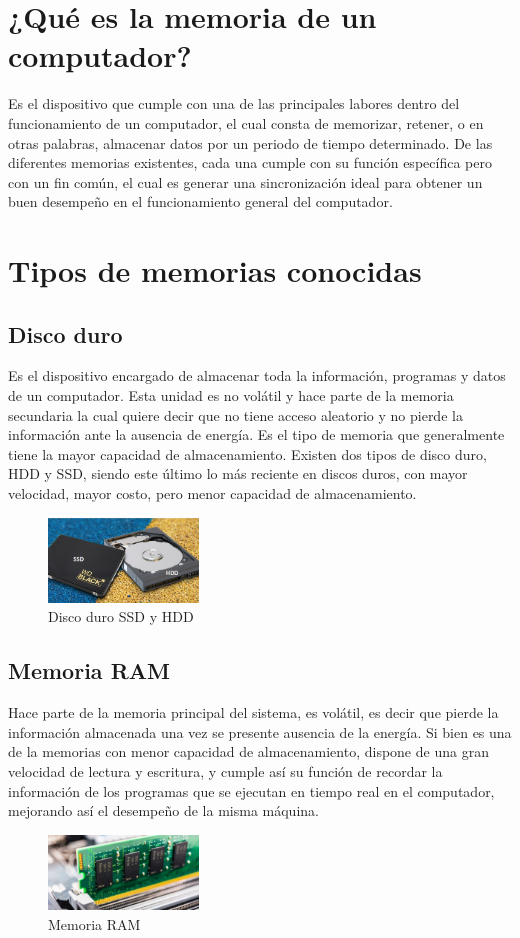 \documentclass{article}
\begin{document}
\section{¿Qué es la memoria de un computador?}
Es el dispositivo que cumple con una de las principales labores dentro del funcionamiento de un computador, el cual consta de memorizar, retener, o en otras palabras, almacenar datos por un periodo de tiempo determinado. De las diferentes memorias existentes, cada una cumple con su función específica pero con un fin común, el cual es generar una sincronización ideal para obtener un buen desempeño en el funcionamiento general del computador. \cite{gestion}

\section{Tipos de memorias conocidas} \label{contenido}

\subsection{Disco duro}

Es el dispositivo encargado de almacenar toda la información, programas y datos de un computador. Esta unidad es no volátil y hace parte de la memoria secundaria la cual quiere decir que no tiene acceso aleatorio y no pierde la información ante la ausencia de energía. Es el tipo de memoria que generalmente tiene la mayor capacidad de almacenamiento. Existen dos tipos de disco duro, HDD y SSD, siendo este último lo más reciente en discos duros, con mayor velocidad, mayor costo, pero menor capacidad de almacenamiento. \cite{wikipedia}

\begin{figure}[h]
\includegraphics[width=4cm]{discoduro.PNG}
\centering
\caption{Disco duro SSD y HDD}
\end{figure}

\subsection{Memoria RAM}
Hace parte de la memoria principal del sistema, es volátil, es decir que pierde la información almacenada una vez se presente ausencia de la energía. Si bien es una de la memorias con menor capacidad de almacenamiento, dispone de una gran velocidad de lectura y escritura, y cumple así su función de recordar la información de los programas que se ejecutan en tiempo real en el computador, mejorando así el desempeño de la misma máquina. \cite{ram}
\begin{figure}[h]
\includegraphics[width=4cm]{ram.jpg}
\centering
\caption{Memoria RAM}
\end{figure}
\end{document}
